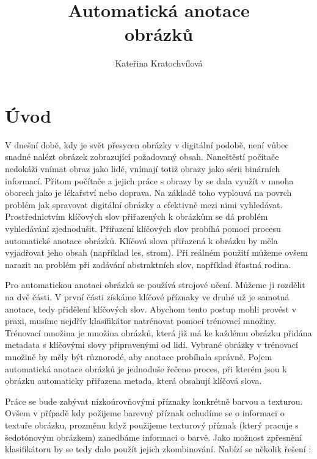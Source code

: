 \documentclass[czech,BP]{thesiskiv}
\author{Kateřina Kratochvílová}
\title{Automatická anotace\\obrázků}
\begin{document}
%
\maketitle
\tableofcontents
{}
\thispagestyle{empty}


\chapter{Úvod}
\setcounter{page}{1}
\par V dnešní době, kdy je svět přesycen obrázky v digitální podobě, není vůbec snadné nalézt obrázek zobrazující požadovaný obsah. Naneštěstí počítače nedokáží vnímat obraz jako lidé, vnímají totiž obrazy jako sérii binárních informací. Přitom počítače a jejich práce s obrazy by se dala využít v mnoha oborech jako je lékařství nebo doprava. Na základě toho vyplouvá na povrch problém jak spravovat digitální obrázky a efektivně mezi nimi vyhledávat. Prostřednictvím klíčových slov přiřazených k obrázkům se dá problém vyhledávání zjednodušit. Přiřazení klíčových slov probíhá pomocí procesu automatické anotace obrázků. Klíčová slova přiřazená k obrázku by měla vyjadřovat jeho obsah (například les, strom). Při reálném použití můžeme ovšem narazit na problém při zadávání abstraktních slov, například šťastná rodina.  

\par Pro automatickou anotaci obrázků se používá strojové učení. Můžeme ji rozdělit na dvě části. V první části získáme klíčové příznaky ve druhé už je samotná anotace, tedy přidělení klíčových slov. Abychom tento postup mohli provést v praxi, musíme nejdřív klasifikátor natrénovat pomocí trénovací množiny. Trénovací množina je množina obrázků, která již má ke každému obrázku přidána metadata s klíčovými slovy připravenými od lidí. Vybrané obrázky v trénovací množině by měly být různorodé, aby anotace probíhala správně. Pojem automatická anotace obrázků je jednoduše řečeno proces, při kterém jsou k obrázku automaticky přiřazena metada, která obsahují klíčová slova. 

\par Práce se bude zabývat nízkoúrovňovými příznaky konkrétně barvou a texturou. Ovšem v případě kdy požijeme barevný příznak ochudíme se o informaci o textuře obrázku, prozměnu když použijeme texturový příznak (který pracuje s šedotónovým obrázkem) zanedbáme informaci o barvě. Jako možnost zpřesnění klasifikátoru by se tedy dalo použít jejich zkombinování. Nabízí se několik řešení \cite{DiplomovaBrno}:   
\end{document}
